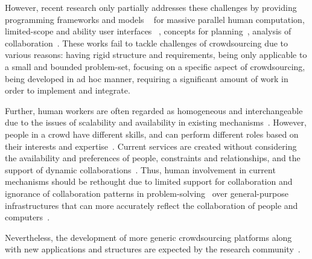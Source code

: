 However, recent research only partially addresses these challenges by 
providing programming frameworks and models
~\cite{Kittur2011, Ahmad2011, Kokciyan2012, Little2009, Minder2011, Barowy2012, Kulkarni2012, Kittur2012} 
for massive parallel human computation, limited-scope and ability user interfaces
~\cite{Marcus2011, Bernstein2010, Marcus2011b, Rzeszotarski2012}, 
concepts for planning~\cite{Zhang2012}, 
analysis of collaboration~\cite{Dorn2012}. 
These works fail to tackle challenges of crowdsourcing due to various reasons: 
having rigid structure and requirements, being only applicable to a small and 
bounded problem-set, focusing on a specific aspect of crowdsourcing, 
being developed in ad hoc manner, requiring a significant amount of work in 
order to implement and integrate.


Further, human workers are often regarded as homogeneous and 
interchangeable due to the issues of scalability and availability in existing 
mechanisms~\cite{Ahmad2011}. However, people in a crowd have different 
skills, and can perform different roles based on their interests and expertise~\cite{Zhang2011}. 
Current services are created without considering the availability and preferences of 
people, constraints and relationships, and the support of dynamic 
collaborations~\cite{Schall2010}. Thus, human involvement in current mechanisms should 
be rethought due to limited support for collaboration and 
ignorance of collaboration patterns in problem-solving~\cite{Dorn2012a} 
over general-purpose infrastructures that can more accurately reflect 
the collaboration of people and computers~\cite{Minder2012, Bernstein2012}.


 
Nevertheless, the development of more generic crowdsourcing platforms 
along with new applications and structures are expected 
by the research community~\cite{Doan2011}.


